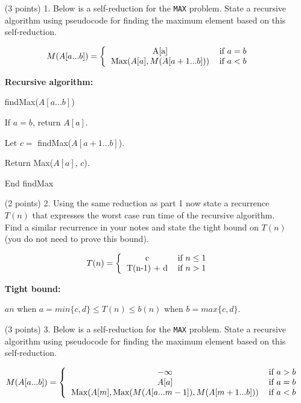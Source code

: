 \documentclass[paper=a4, fontsize=11pt]{scrartcl}
\numberwithin{equation}{section}		%
\numberwithin{figure}{section}			%
\numberwithin{table}{section}				%
\begin{document}
\begin{enumerate}
\item [(3 points) 1.] Below is a self-reduction for the \texttt{MAX} problem.  State a recursive algorithm using pseudocode for finding the maximum element based on this self-reduction.

\[
M(A[a...b]) = \left\{
\begin{tabular}{cc}
A[a] & \text{if} $a = b$ \\
$\text{Max}(A[a],M(A[a+1...b]))$ & \text{if} $a<b$ \\
\end{tabular}\right.
\]

\textbf{Recursive algorithm:}

findMax($A[a...b]$) 
	
\hspace{5ex} If $a=b$, return $A[a]$.

\hspace{5ex} Let $c=$ findMax($A[a+1\dots b]$).

\hspace{5ex} Return Max($A[a]$, $c$).

End findMax



\item [(2 points) 2.] Using the same reduction as part 1 now state a recurrence $T(n)$ that expresses the worst case run time of the recursive algorithm.  Find a similar recurrence in your notes and state the tight bound on $T(n)$ (you do not need to prove this bound).

\[
T(n) = \left\{
\begin{tabular}{cc}
	c & if $n \leq 1$ \\
	T(n-1) + d & if $n > 1$
\end{tabular}\right.
\]

\textbf{Tight bound:}

$an$ when $a=min\{c, d\} \leq T(n) \leq b(n)$ when $b=max\{c,d\}$.




\item [(3 points) 3.] Below is a self-reduction for the \texttt{MAX} problem.  State a recursive algorithm using pseudocode for finding the maximum element based on this self-reduction.

\[
M(A[a...b]) = \left\{
\begin{tabular}{cc}
$-\infty$ & \text{if} $a > b$ \\
$A[a]$ & \text{if} $a = b$ \\
$\text{Max}(A[m], \text{Max}(M(A[a...m-1]),M(A[m+1...b]))$ & \text{if} $a<b$ \\
\end{tabular}\right.
\]


\end{enumerate}
\end{document}
